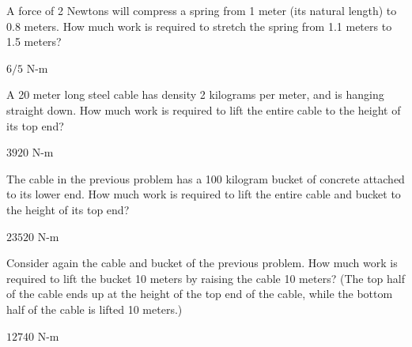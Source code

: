 \begin{enumialphparenastyle}
\begin{ex}
 A force of 2 Newtons will compress a spring from 1 meter
(its natural length) to
0.8 meters. How much work is required to stretch the spring from 
1.1 meters to 1.5 meters?
\begin{sol}
 $6/5$ N-m
\end{sol}
\end{ex}

\begin{ex}
 A 20 meter long steel cable has density 2 kilograms per
meter, and is hanging straight down. How much work is required to lift
the entire cable to the height of its top end?
\begin{sol}
 $3920$ N-m
\end{sol}
\end{ex}

\begin{ex}
 The cable in the previous problem has a 100 kilogram bucket
of concrete attached to its lower end. How much work is required to lift
the entire cable and bucket to the height of its top end?
\begin{sol}
 $23520$ N-m
\end{sol}
\end{ex}

\begin{ex}
 Consider again the cable and bucket of the previous problem.
How much work is required to lift the bucket 10 meters by raising the
cable 10 meters? (The top half of the cable ends up at the height of
the top end of the cable, while the bottom half of the cable is lifted
10 meters.)
\begin{sol}
 $12740$ N-m
\end{sol}
\end{ex}

\end{enumialphparenastyle}